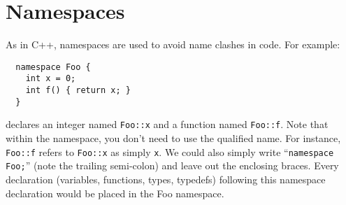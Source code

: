 \section{Namespaces}

% 

As in C++, namespaces are used to avoid name clashes in code.  For
example:
\begin{verbatim}
  namespace Foo { 
    int x = 0; 
    int f() { return x; }  
  }
\end{verbatim}
declares an integer named \texttt{Foo::x} and a function named
\texttt{Foo::f}.  Note that within the namespace, you don't need to use
the qualified name.  For instance, \texttt{Foo::f} refers to
\texttt{Foo::x} as simply \texttt{x}.  We could also simply write
``\texttt{namespace Foo;}'' (note the trailing semi-colon) and leave out
the enclosing braces.  Every declaration (variables, functions, types,
typedefs) following this namespace declaration would be placed in the
Foo namespace.

